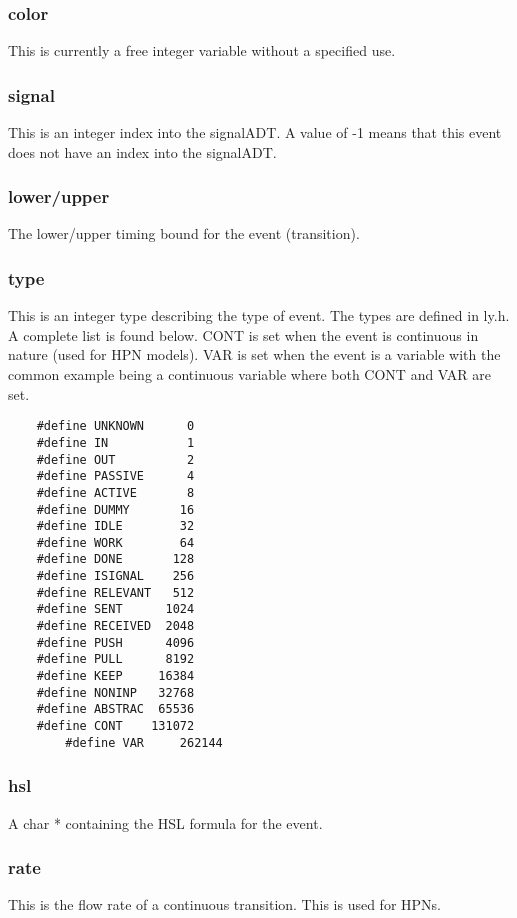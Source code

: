 \documentclass[titlepage,11pt]{article}
\begin{document}
  \subsubsection{color}
  This is currently a free integer variable without a specified use.
  
  \subsubsection{signal}
  This is an integer index into the signalADT.  A value of -1
  means that this event does not have an index into the signalADT.  

	\subsubsection{lower/upper}
	The lower/upper timing bound for the event (transition).

  \subsubsection{type}
  This is an integer type describing the type of event.  The types are defined in ly.h.  A complete list is found below.  CONT is set when the event is continuous in nature (used for HPN models).  VAR is set when the event is a variable with the common example being a continuous variable where both CONT and VAR are set.

  \begin{verbatim}
    #define UNKNOWN      0
    #define IN           1
    #define OUT          2
    #define PASSIVE      4
    #define ACTIVE       8
    #define DUMMY       16
    #define IDLE        32
    #define WORK        64
    #define DONE       128
    #define ISIGNAL    256
    #define RELEVANT   512
    #define SENT      1024
    #define RECEIVED  2048
    #define PUSH      4096
    #define PULL      8192
    #define KEEP     16384
    #define NONINP   32768
    #define ABSTRAC  65536
    #define CONT    131072
		#define VAR     262144
  \end{verbatim}

  \subsubsection{hsl}
  A char * containing the HSL formula for the event.

  \subsubsection{rate}
  This is the flow rate of a continuous transition.  This is used for
  HPNs.
\end{document}
